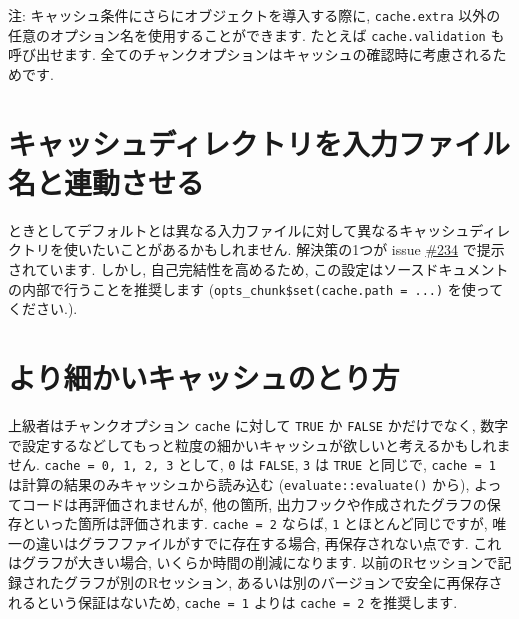 \documentclass[
  xelatex,ja=standard,jafont=noto]{bxjsreport}
\begin{document}
注: キャッシュ条件にさらにオブジェクトを導入する際に,
\texttt{cache.extra} 以外の任意のオプション名を使用することができます.
たとえば \texttt{cache.validation} も呼び出せます.
全てのチャンクオプションはキャッシュの確認時に考慮されるためです.

\hypertarget{ux30adux30e3ux30c3ux30b7ux30e5ux30c7ux30a3ux30ecux30afux30c8ux30eaux3092ux5165ux529bux30d5ux30a1ux30a4ux30ebux540dux3068ux9023ux52d5ux3055ux305bux308b}{%
\section*{キャッシュディレクトリを入力ファイル名と連動させる}\label{ux30adux30e3ux30c3ux30b7ux30e5ux30c7ux30a3ux30ecux30afux30c8ux30eaux3092ux5165ux529bux30d5ux30a1ux30a4ux30ebux540dux3068ux9023ux52d5ux3055ux305bux308b}}

ときとしてデフォルトとは異なる入力ファイルに対して異なるキャッシュディレクトリを使いたいことがあるかもしれません.
解決策の1つが issue
\href{https://github.com/yihui/knitr/issues/234}{\#234}
で提示されています. しかし, 自己完結性を高めるため,
この設定はソースドキュメントの内部で行うことを推奨します
(\texttt{opts\_chunk\$set(cache.path\ =\ ...)} を使ってください.).

\hypertarget{ux3088ux308aux7d30ux304bux3044ux30adux30e3ux30c3ux30b7ux30e5ux306eux3068ux308aux65b9}{%
\section*{より細かいキャッシュのとり方}\label{ux3088ux308aux7d30ux304bux3044ux30adux30e3ux30c3ux30b7ux30e5ux306eux3068ux308aux65b9}}

上級者はチャンクオプション \texttt{cache} に対して \texttt{TRUE} か
\texttt{FALSE} かだけでなく,
数字で設定するなどしてもっと粒度の細かいキャッシュが欲しいと考えるかもしれません.
\texttt{cache\ =\ 0,\ 1,\ 2,\ 3} として, \texttt{0} は \texttt{FALSE},
\texttt{3} は \texttt{TRUE} と同じで, \texttt{cache\ =\ 1}
は計算の結果のみキャッシュから読み込む (\texttt{evaluate::evaluate()}
から), よってコードは再評価されませんが, 他の箇所,
出力フックや作成されたグラフの保存といった箇所は評価されます.
\texttt{cache\ =\ 2} ならば, \texttt{1} とほとんど同じですが,
唯一の違いはグラフファイルがすでに存在する場合, 再保存されない点です.
これはグラフが大きい場合, いくらか時間の削減になります.
以前のRセッションで記録されたグラフが別のRセッション,
あるいは別のバージョンで安全に再保存されるという保証はないため,
\texttt{cache\ =\ 1} よりは \texttt{cache\ =\ 2} を推奨します.
\end{document}
